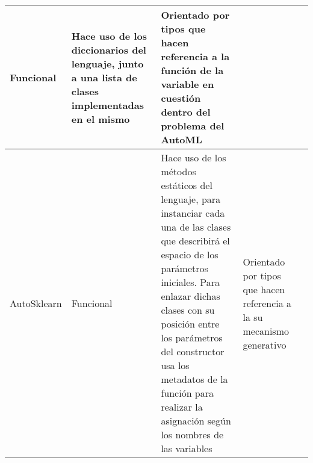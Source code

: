 \begin{longtable}{  p{2.15cm}  p{2.4cm}  p{4.75cm}  p{4.65cm}  p{5.45cm} }
    Funcional                                                                                                                                                                                                                                                                                                                    &
    Hace uso de los diccionarios del lenguaje, junto a una lista de clases implementadas en el mismo                                                                                                                                                                                                                             &
    Orientado por tipos que hacen referencia a la función de la variable en cuestión dentro del problema del AutoML                                                                                                                                                                                                              &
    \\
    \hline
    \rowcolor{lavender}
    AutoSklearn                                                                                                                                                                                                                                                                                                                  &
    Funcional                                                                                                                                                                                                                                                                                                                    &
    Hace uso de los métodos estáticos del lenguaje, para instanciar cada una de las clases que describirá el espacio de los parámetros iniciales. Para enlazar dichas clases con su posición entre los parámetros del constructor usa los metadatos de la función para realizar la asignación según los nombres de las variables &
    Orientado por tipos que hacen referencia a la su mecanismo generativo                                                                                                                                                                                                                                                        &
    \\

\end{longtable}
